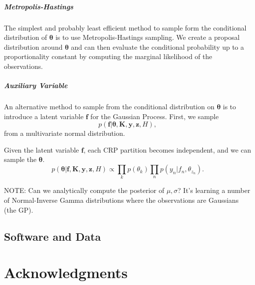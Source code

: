 \documentclass{article}
\begin{document}
\subparagraph{Metropolis-Hastings}
The simplest and probably least efficient method to sample form the conditional distribution of $\bm{\theta}$ is to use Metropolis-Hastings sampling. We create a proposal distribution around $\bm{\theta}$ and can then evaluate the conditional probability up to a proportionality constant by computing the marginal likelihood of the observations.

\subparagraph{Auxiliary Variable}
An alternative method to sample from the conditional distribution on $\bm{\theta}$ is to introduce a latent variable $\bm{f}$ for the Gaussian Process. First, we sample
\begin{equation}
p(\bm{f} | \bm{\theta}, \bm{K}, \bm{y}, \bm{z}, H),
\end{equation}
from a multivariate normal distribution.

Given the latent variable $\bm{f}$, each CRP partition becomes independent, and we can sample the $\bm{\theta}$.
\begin{equation}
p(\bm{\theta} | \bm{f}, \bm{K}, \bm{y}, \bm{z}, H) \propto \prod_k p(\theta_k) \prod_n p(y_n | f_n, \theta_{z_n}).
\end{equation}

NOTE: Can we analytically compute the posterior of $\mu,\sigma$? It's learning a number of Normal-Inverse Gamma distributions where the observations are Gaussians (the GP).






\subsection{Software and Data}


\section*{Acknowledgments} 



\end{document}
